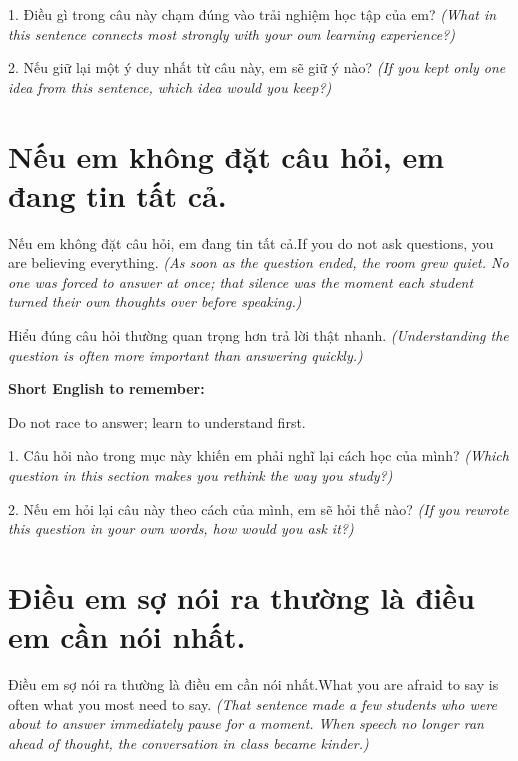 \begin{tuhocnhanh}
1. Điều gì trong câu này chạm đúng vào trải nghiệm học tập của em? \textit{(What in this sentence connects most strongly with your own learning experience?)}

2. Nếu giữ lại một ý duy nhất từ câu này, em sẽ giữ ý nào? \textit{(If you kept only one idea from this sentence, which idea would you keep?)}
\end{tuhocnhanh}
\ngancach


\section{Nếu em không đặt câu hỏi, em đang tin tất cả.}
\begin{truyen}{Nếu em không đặt câu hỏi, em đang tin tất cả.}{If you do not ask questions, you are believing everything.}
\textit{(As soon as the question ended, the room grew quiet. No one was forced to answer at once; that silence was the moment each student turned their own thoughts over before speaking.)}
\end{truyen}

\begin{baihoc}
Hiểu đúng câu hỏi thường quan trọng hơn trả lời thật nhanh.
\textit{(Understanding the question is often more important than answering quickly.)}
\end{baihoc}

\begin{ghinhoanh}
\textbf{Short English to remember:}

Do not race to answer; learn to understand first.

\end{ghinhoanh}

\begin{tuhocnhanh}
1. Câu hỏi nào trong mục này khiến em phải nghĩ lại cách học của mình? \textit{(Which question in this section makes you rethink the way you study?)}

2. Nếu em hỏi lại câu này theo cách của mình, em sẽ hỏi thế nào? \textit{(If you rewrote this question in your own words, how would you ask it?)}
\end{tuhocnhanh}
\ngancach


\section{Điều em sợ nói ra thường là điều em cần nói nhất.}
\begin{truyen}{Điều em sợ nói ra thường là điều em cần nói nhất.}{What you are afraid to say is often what you most need to say.}
\textit{(That sentence made a few students who were about to answer immediately pause for a moment. When speech no longer ran ahead of thought, the conversation in class became kinder.)}
\end{truyen}

